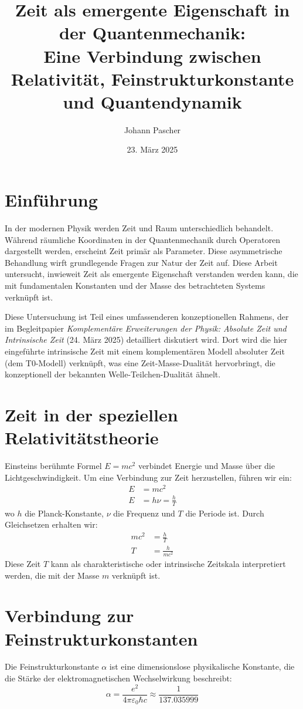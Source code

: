 \documentclass{article}
\title{Zeit als emergente Eigenschaft in der Quantenmechanik: \\Eine Verbindung zwischen Relativität, Feinstrukturkonstante und Quantendynamik}
\author{Johann Pascher}
\date{23. März 2025}
\begin{document}
	
	\maketitle
	
	\tableofcontents
	
	\section{Einführung}
	In der modernen Physik werden Zeit und Raum unterschiedlich behandelt. Während räumliche Koordinaten in der Quantenmechanik durch Operatoren dargestellt werden, erscheint Zeit primär als Parameter. Diese asymmetrische Behandlung wirft grundlegende Fragen zur Natur der Zeit auf. Diese Arbeit untersucht, inwieweit Zeit als emergente Eigenschaft verstanden werden kann, die mit fundamentalen Konstanten und der Masse des betrachteten Systems verknüpft ist.
	
	Diese Untersuchung ist Teil eines umfassenderen konzeptionellen Rahmens, der im Begleitpapier \textit{Komplementäre Erweiterungen der Physik: Absolute Zeit und Intrinsische Zeit} (24. März 2025) detailliert diskutiert wird. Dort wird die hier eingeführte intrinsische Zeit mit einem komplementären Modell absoluter Zeit (dem T0-Modell) verknüpft, was eine Zeit-Masse-Dualität hervorbringt, die konzeptionell der bekannten Welle-Teilchen-Dualität ähnelt.
	
	\section{Zeit in der speziellen Relativitätstheorie}
	Einsteins berühmte Formel \( E = mc^2 \) verbindet Energie und Masse über die Lichtgeschwindigkeit. Um eine Verbindung zur Zeit herzustellen, führen wir ein:
	\begin{align}
		E &= mc^2 \\
		E &= h\nu = \frac{h}{T}
	\end{align}
	wo \( h \) die Planck-Konstante, \( \nu \) die Frequenz und \( T \) die Periode ist. Durch Gleichsetzen erhalten wir:
	\begin{align}
		mc^2 &= \frac{h}{T} \\
		T &= \frac{h}{mc^2}
	\end{align}
	Diese Zeit \( T \) kann als charakteristische oder intrinsische Zeitskala interpretiert werden, die mit der Masse \( m \) verknüpft ist.
	
	\section{Verbindung zur Feinstrukturkonstanten}
	Die Feinstrukturkonstante \( \alpha \) ist eine dimensionslose physikalische Konstante, die die Stärke der elektromagnetischen Wechselwirkung beschreibt:
	\begin{equation}
		\alpha = \frac{e^2}{4\pi\varepsilon_0\hbar c} \approx \frac{1}{137.035999}
	\end{equation}
	
\end{document}
